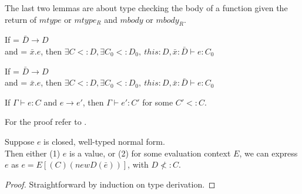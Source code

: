 The last two lemmas are about type checking the body of a function
given the return of $mtype$ or $mtype_R$ and $mbody$ or $mbody_R$.

\begin{lemma}
    If  = $\bar{D} \rightarrow D$ \\
            and  = $\bar{x}.e$,
            then $\exists C <: D, \exists C_0 <: D_0,~this: D, \bar{x}: \bar{D}\vdash e: C_0$
\end{lemma}

\begin{lemma}
    If  = $\bar{D} \rightarrow D$ \\
            and  = $\bar{x}.e$, 
            then $\exists C <: D, \exists C_0 <: D_0,~this: D, \bar{x}: \bar{D}\vdash e: C_0$
\end{lemma}

\begin{theorem}[Preservation]
    If $\Gamma \vdash e : C$ and $e \rightarrow e'$,
    then $\Gamma \vdash e': C'$ for some $C' <: C$.
\end{theorem}
For the proof refer to \cite{igarashi_featherweight_2001}.

\begin{theorem}[Progress]
    Suppose $e$ is closed, well-typed normal form.\\
    Then either (1) $e$ is a value, or (2) for some evaluation context $E$, we can
    express $e$ as $e = E[(C)(new D(\bar{e}))]$, with $D \nless: C$.
\end{theorem}
\begin{proof} 
    Straightforward by induction on type derivation.
\end{proof}



